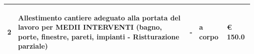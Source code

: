 \documentclass[a4paper]{article}
\begin{document}
\begin{tabular}{ | L{10mm} |  L{86mm} | L{12mm} | L{12mm} | L{16mm} | }
                            
                              \vspace{2.5mm}
                              \begin{spacing}{0}
                           2
                              \end{spacing} &
                              \vspace{2.5mm}
                              \begin{spacing}{0}
                           Allestimento cantiere adeguato alla portata del lavoro per MEDII INTERVENTI (bagno, porte, finestre, pareti, impianti - Ristturazione parziale)
                              \end{spacing} &
                              \vspace{2.5mm}
                              \begin{spacing}{0}
                           -
                              \end{spacing} &
                              \vspace{2.5mm}
                              \begin{spacing}{0}
                           a corpo
                              \end{spacing} &
                              \vspace{2.5mm}
                              \begin{spacing}{0}
                                \euro\hfill 
                            150.0
                              \end{spacing} \\
                              \hline
            
                            
                          \end{tabular}
                          
\end{document}
